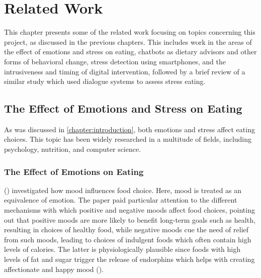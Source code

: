 
\chapter{Related Work}\label{chapter:related_work}
This chapter presents some of the related work focusing on topics concerning this project, as discussed in the previous chapters. This includes work in the areas of the effect of emotions and stress on eating, chatbots as dietary advisors and other forms of behavioral change, stress detection using smartphones, and the intrusiveness and timing of digital intervention, followed by a brief review of a similar study which used dialogue systems to assess stress eating.

\section{The Effect of Emotions and Stress on Eating}
As was discussed in \autoref{chapter:introduction}, both emotions and stress affect eating choices. This topic has been widely researched in a multitude of fields, including psychology, nutrition, and computer science.

\subsection{The Effect of Emotions on Eating}
\citeauthor{4_mood_eat} (\citeyear{4_mood_eat}) investigated how mood influences food choice. Here, mood is treated as an equivalence of emotion. The paper paid particular attention to the different mechanisms with which positive and negative moods affect food choices, pointing out that positive moods are more likely to benefit long-term goals such as health, resulting in choices of healthy food, while negative moods cue the need of relief from such moods, leading to choices of indulgent foods which often contain high levels of calories. The latter is physiologically plausible since foods with high levels of fat and sugar trigger the release of endorphins which helps with creating affectionate and happy mood (\cite{32_endorphins}).\bigskip

